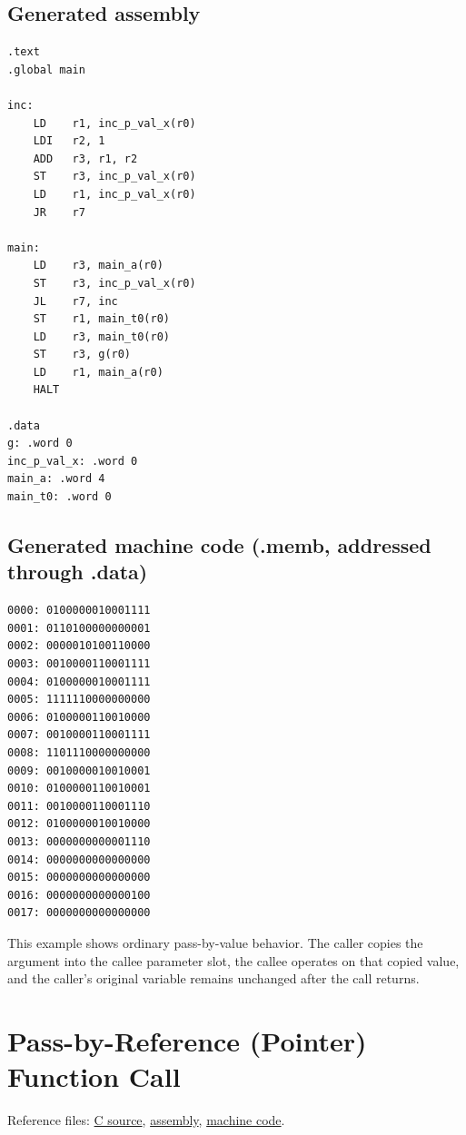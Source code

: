 \documentclass[12pt]{report}
\begin{document}
\subsection*{Generated assembly}
\begin{lstlisting}[language=CustomISAAsm]
.text
.global main

inc:
    LD    r1, inc_p_val_x(r0)
    LDI   r2, 1
    ADD   r3, r1, r2
    ST    r3, inc_p_val_x(r0)
    LD    r1, inc_p_val_x(r0)
    JR    r7

main:
    LD    r3, main_a(r0)
    ST    r3, inc_p_val_x(r0)
    JL    r7, inc
    ST    r1, main_t0(r0)
    LD    r3, main_t0(r0)
    ST    r3, g(r0)
    LD    r1, main_a(r0)
    HALT

.data
g: .word 0
inc_p_val_x: .word 0
main_a: .word 4
main_t0: .word 0
\end{lstlisting}

\subsection*{Generated machine code (.memb, addressed through .data)}
\begin{lstlisting}
0000: 0100000010001111
0001: 0110100000000001
0002: 0000010100110000
0003: 0010000110001111
0004: 0100000010001111
0005: 1111110000000000
0006: 0100000110010000
0007: 0010000110001111
0008: 1101110000000000
0009: 0010000010010001
0010: 0100000110010001
0011: 0010000110001110
0012: 0100000010010000
0013: 0000000000001110
0014: 0000000000000000
0015: 0000000000000000
0016: 0000000000000100
0017: 0000000000000000
\end{lstlisting}

This example shows ordinary pass-by-value behavior. The caller copies the argument into the callee parameter slot, the callee operates on that copied value, and the caller's original variable remains unchanged after the call returns.

\section{Pass-by-Reference (Pointer) Function Call}
Reference files:
\href{https://github.com/shorewind/Custom-ISA-Toolchain/blob/main/tests/feature-check/calls/ptr-param.c}{C source},
\href{https://github.com/shorewind/Custom-ISA-Toolchain/blob/main/tests/feature-check/calls/ptr-param.s}{assembly},
\href{https://github.com/shorewind/Custom-ISA-Toolchain/blob/main/tests/feature-check/calls/ptr-param.memb}{machine code}.
\end{document}
